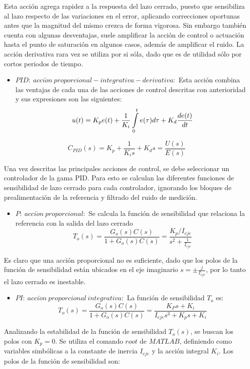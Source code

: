 \documentclass[\main/main.tex]{subfiles}
\begin{document}
Esta acción agrega rapidez a la respuesta del lazo cerrado, puesto
que sensibiliza al lazo respecto de las variaciones en el error, aplicando
correcciones oportunas antes que la magnitud del mismo crezca de forma
vigorosa. Sin embargo también cuenta con algunas desventajas, suele
amplificar la acción de control o actuación hasta el punto de saturación
en algunos casos, además de amplificar el ruido. La acción derivativa
rara vez se utiliza por si sóla, dado que es de utilidad sólo por
cortos periodos de tiempo. 
\begin{itemize}
\item $PID:\ acci\acute{o}n\ proporcional-integrativa-derivativa:$ Esta
acción combina las ventajas de cada una de las acciones de control
descritas con anterioridad y sus expresiones son las siguientes:
\[
u(t)=K_{p}e(t)+\frac{1}{K_{i}}\intop_{0}^{t}e(\tau)d\tau+K_{d}\frac{de(t)}{dt}
\]
\end{itemize}
\[
C_{PID}(s)=K_{p}+\frac{1}{K_{i}s}+K_{d}s=\frac{U(s)}{E(s)}
\]

Una vez descritas las principales acciones de control, se debe seleccionar
un controlador de la gama PID. Para esto se calculan las diferentes
funciones de sensibilidad de lazo cerrado para cada controlador, ignorando
los bloques de prealimentación de la referencia y filtrado del ruido
de medición.
\begin{itemize}
\item $P:\ acci\acute{o}n\ proporcional:$ Se calcula la función de sensibilidad
que relaciona la referencia con la salida del lazo cerrado
\[
T_{o}(s)=\frac{G_{o}(s)C(s)}{1+G_{o}(s)C(s)}=\frac{K_{p}/I_{eje}}{s^{2}+\frac{1}{I_{eje}}}
\]
\end{itemize}

Es claro que una acción proporcional no es suficiente, dado que los
polos de la función de sensibilidad están ubicados en el eje imaginario
$s=\pm\frac{j}{I_{eje}}$, por lo tanto el lazo cerrado es inestable.

\begin{itemize}
\item $PI:\ acci\acute{o}n\ proporcional\ integrativa:$ La función de sensibilidad
$T_{o}$ es:
\[
T_{o}(s)=\frac{G_{o}(s)C(s)}{1+G_{o}(s)C(s)}=\frac{K_{P}s+K_{i}}{I_{eje}s^{3}+K_{p}s+K_{i}}
\]
\end{itemize}

Analizando la estabilidad de la función de sensibilidad $T_{o}(s)$,
se buscan los polos con $K_{p}=0.$ Se utiliza el comando $root$
de $MATLAB$, definiendo como variables simbólicas a la constante
de inercia $I_{eje}$ y la acción integral $K_{i}$. Los polos de
la función de sensibilidad son:
\end{document}
